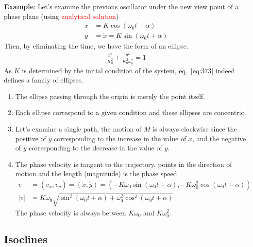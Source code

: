 {\bf Example}: Let's examine the previous oscillator under the new
view point of a phase plane (using
\textcolor{red}{analytical solution})
\begin{equation}
  \label{eq:362}
  \begin{split}
    x &= K\cos(\omega_0t+\alpha)\\
    y &= \dot{x}= K\sin(\omega_0t+\alpha)
  \end{split}
\end{equation}
Then, by eliminating the time, we have the form of an ellipse.
\begin{equation}
  \label{eq:373}
  \begin{split}
    \frac{x^2}{K_0^2}+\frac{y^2}{K_0^2\omega_0^2} = 1
  \end{split}
\end{equation}
As $K$ is determined by the initial condition of the system, eq.~\eqref{eq:373}
indeed defines a family of ellipses. 


\begin{enumerate}
\item The ellipse passing through the origin is merely the point
  itself.

\item Each ellipse correspond to a given condition and these ellipses
  are concentric.

\item Let's examine a single path, the motion of $M$ is always
  clockwise since the positive of $y$ corresponding to the increase in
  the value of $x$, and the negative of $y$ corresponding to the
  decrease in the value of $y$.

\item The phase velocity is tangent to the trajectory, points in the
  direction of motion and the length (magnitude) is the phase speed
  \begin{equation}
    \label{eq:365}
    \begin{split}
          v
          &= (v_x, v_y) = (\dot{x},\dot{y})= (-K\omega_0\sin(\omega_0t+\alpha),-K\omega^2_0\cos(\omega_0t+\alpha))
          \\
          |v|&=K\omega_0\sqrt{\sin^2(\omega_0t+\alpha)+\omega^2_0\cos^2(\omega_0t+\alpha)}
    \end{split}
  \end{equation}
The phase velocity is always between $K\omega_0$ and $K\omega^2_0$.
\end{enumerate}

\subsection{Isoclines}
\label{sec:isoclines}

